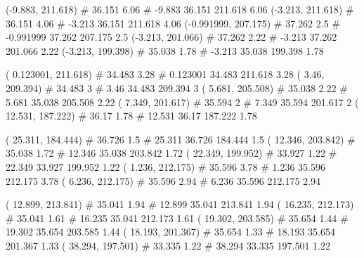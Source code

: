 \documentclass[a4paper,openbib,10pt]{article}
\newenvironment{treegraph}{\begin{graph}}{\end{graph}}
\begin{document}
\begin{treegraph}
  (-9.883, 211.618) #     36.151    6.06
   #    -9.883    36.151    211.618    6.06
  (-3.213, 211.618) #     36.151    4.06
   #    -3.213    36.151    211.618    4.06
  (-0.991999, 207.175) #     37.262    2.5
   #    -0.991999    37.262    207.175    2.5
  (-3.213, 201.066) #     37.262    2.22
   #    -3.213    37.262    201.066    2.22
  (-3.213, 199.398) #     35.038    1.78
   #    -3.213    35.038    199.398    1.78

  ( 0.123001, 211.618) #     34.483    3.28
   #    0.123001    34.483    211.618    3.28
  ( 3.46, 209.394) #     34.483    3
   #    3.46    34.483    209.394    3
  ( 5.681, 205.508) #     35.038    2.22
   #    5.681    35.038    205.508    2.22
  ( 7.349, 201.617) #     35.594    2
   #    7.349    35.594    201.617    2
  ( 12.531, 187.222) #     36.17    1.78
   #    12.531    36.17    187.222    1.78

  ( 25.311, 184.444) #     36.726    1.5
   #    25.311    36.726    184.444    1.5
  ( 12.346, 203.842) #     35.038    1.72
   #    12.346    35.038    203.842    1.72
  ( 22.349, 199.952) #     33.927    1.22
   #    22.349    33.927    199.952    1.22
  ( 1.236, 212.175) #     35.596    3.78
   #    1.236    35.596    212.175    3.78
  ( 6.236, 212.175) #     35.596    2.94
   #    6.236    35.596    212.175    2.94

  ( 12.899, 213.841) #     35.041    1.94
   #    12.899    35.041    213.841    1.94
  ( 16.235, 212.173) #     35.041    1.61
   #    16.235    35.041    212.173    1.61
  ( 19.302, 203.585) #     35.654    1.44
   #    19.302    35.654    203.585    1.44
  ( 18.193, 201.367) #     35.654    1.33
   #    18.193    35.654    201.367    1.33
  ( 38.294, 197.501) #     33.335    1.22
   #    38.294    33.335    197.501    1.22


\end{treegraph}
\end{document}
